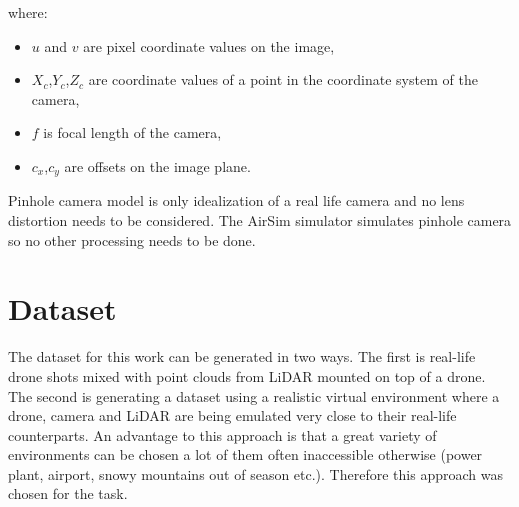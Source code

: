 \documentclass[twoside]{ctuthesis}
\theoremstyle{plain}
\theoremstyle{definition}
\theoremstyle{note}
\begin{document}
where:
\begin{itemize}
	\item $u$ and $v$ are pixel coordinate values on the image,
	\item $X_c$,$Y_c$,$Z_c$ are coordinate values of a point in the coordinate system of the camera,
	\item $f$ is focal length of the camera,
	\item $c_x$,$c_y$ are offsets on the image plane.
\end{itemize}
Pinhole camera model is only idealization of a real life camera and no lens distortion needs to be considered. The AirSim simulator simulates pinhole camera so no other processing needs to be done.
\section{Dataset} \label{s:2.6}
The dataset for this work can be generated in two ways. The first is real-life drone shots mixed with point clouds from LiDAR mounted on top of a drone. The second is generating a dataset using a realistic virtual environment where a drone, camera and LiDAR are being emulated very close to their real-life counterparts. An advantage to this approach is that a great variety of environments can be chosen a lot of them often inaccessible otherwise (power plant, airport, snowy mountains out of season etc.). Therefore this approach was chosen for the task.
\end{document}
